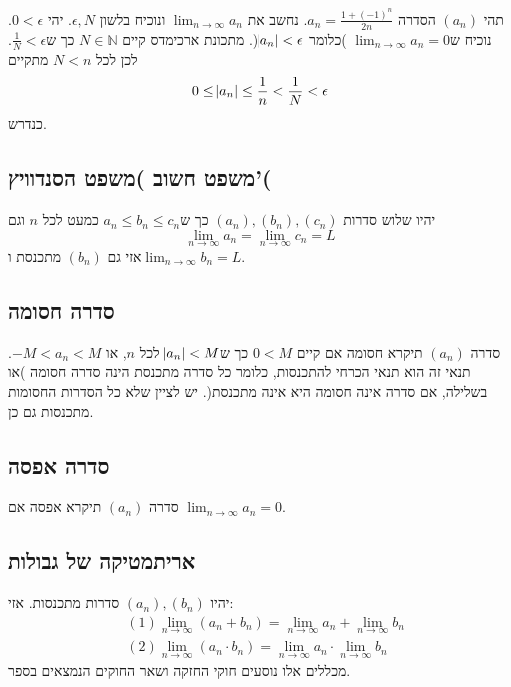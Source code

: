 \documentclass[11pt, oneside]{article}
\newcommand{\mN}{\mathbb{N}}
\begin{document}
תהי $(a_n)$ הסדרה $a_n = \frac{1 + (-1)^n}{2n}$. נחשב את $\lim_{n \to \infty} a_n$ ונוכיח בלשון $\epsilon, N$. יהי $0 < \epsilon$. נוכיח ש$\lim_{n \to \infty} a_n = 0$ )כלומר $\abs{a_n} < \epsilon$(. מתכונת ארכימדס קיים $N \in \mN$ כך ש$\frac{1}{N} < \epsilon$. לכן לכל $N < n$ מתקיים
\[
0 \le \abs{a_n} \le \frac{1}{n} < \frac{1}{N} < \epsilon
\]
כנדרש.

\subsection{משפט חשוב )משפט הסנדוויץ'(}
יהיו שלוש סדרות $(a_n), (b_n), (c_n)$ כך ש$a_n \le b_n \le c_n$ כמעט לכל $n$ וגם
\[
\lim_{n \to \infty} a_n = \lim_{n \to \infty} c_n = L
\]
אזי גם $(b_n)$ מתכנסת ו$\lim_{n \to \infty} b_n = L$.

\subsection{סדרה חסומה}
סדרה $(a_n)$ תיקרא חסומה אם קיים $0 < M$ כך ש$\abs{a_n} < M$ לכל $n$, או $-M < a_n < M$. תנאי זה הוא תנאי הכרחי להתכנסות, כלומר כל סדרה מתכנסת הינה סדרה חסומה )או בשלילה, אם סדרה אינה חסומה היא אינה מתכנסת(. יש לציין שלא כל הסדרות החסומות מתכנסות גם כן.
\subsection{סדרה אפסה}
סדרה $(a_n)$ תיקרא אפסה אם $\lim_{n \to \infty} a_n = 0$.
\subsection{אריתמטיקה של גבולות}
יהיו $(a_n), (b_n)$ סדרות מתכנסות. אזי:
\begin{align*}
& (1) \lim_{n \to \infty} (a_n + b_n) = \lim_{n \to \infty} a_n + \lim_{n \to \infty} b_n\\
& (2) \lim_{n \to \infty} (a_n \cdot b_n) = \lim_{n \to \infty} a_n \cdot \lim_{n \to \infty} b_n
\end{align*}
מכללים אלו נוסעים חוקי החזקה ושאר החוקים הנמצאים בספר.
\end{document}
